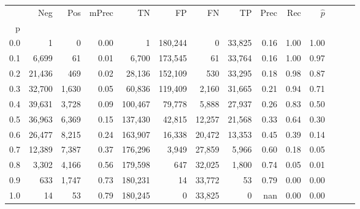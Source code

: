 \begin{tabular}{rrrrrrrrrrrrrr}
\toprule
{} &     Neg &    Pos & mPrec &       TN &       FP &      FN &      TP &  Prec &   Rec & $\hat{p}$ \\
p   &         &        &       &          &          &         &         &       &       &           \\
\midrule
0.0 &       1 &      0 &  0.00 &        1 &  180,244 &       0 &  33,825 &  0.16 &  1.00 &      1.00 \\
0.1 &   6,699 &     61 &  0.01 &    6,700 &  173,545 &      61 &  33,764 &  0.16 &  1.00 &      0.97 \\
0.2 &  21,436 &    469 &  0.02 &   28,136 &  152,109 &     530 &  33,295 &  0.18 &  0.98 &      0.87 \\
0.3 &  32,700 &  1,630 &  0.05 &   60,836 &  119,409 &   2,160 &  31,665 &  0.21 &  0.94 &      0.71 \\
0.4 &  39,631 &  3,728 &  0.09 &  100,467 &   79,778 &   5,888 &  27,937 &  0.26 &  0.83 &      0.50 \\
0.5 &  36,963 &  6,369 &  0.15 &  137,430 &   42,815 &  12,257 &  21,568 &  0.33 &  0.64 &      0.30 \\
0.6 &  26,477 &  8,215 &  0.24 &  163,907 &   16,338 &  20,472 &  13,353 &  0.45 &  0.39 &      0.14 \\
0.7 &  12,389 &  7,387 &  0.37 &  176,296 &    3,949 &  27,859 &   5,966 &  0.60 &  0.18 &      0.05 \\
0.8 &   3,302 &  4,166 &  0.56 &  179,598 &      647 &  32,025 &   1,800 &  0.74 &  0.05 &      0.01 \\
0.9 &     633 &  1,747 &  0.73 &  180,231 &       14 &  33,772 &      53 &  0.79 &  0.00 &      0.00 \\
1.0 &      14 &     53 &  0.79 &  180,245 &        0 &  33,825 &       0 &   nan &  0.00 &      0.00 \\
\bottomrule
\end{tabular}
